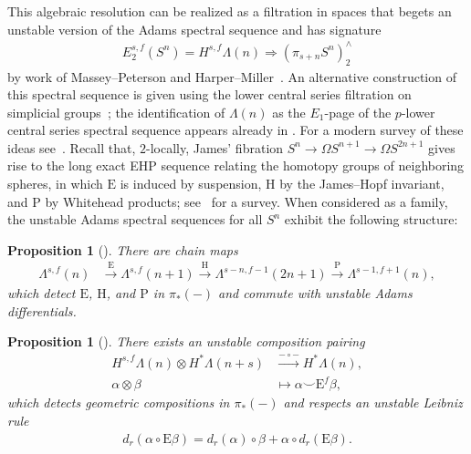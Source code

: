 \documentclass[dvipsnames,table]{amsart}
\newtheorem{proposition}[theorem]{Proposition}
\theoremstyle{definition}
\theoremstyle{remark}
\numberwithin{equation}{section}
\begin{document}
This algebraic resolution can be realized as a filtration in spaces that begets an unstable version of the Adams spectral sequence and has signature
\begin{align*}
  E_{2}^{s, f}(S^n) = H^{s, f}\Lambda(n) \Rightarrow (\pi_{s + n} S^n)^{\wedge}_{2}
\end{align*}
by work of Massey--Peterson and Harper--Miller~\cite{Massey_Peterson_1967, Harper_Miller_1989}.
An alternative construction of this spectral sequence is given using the lower central series filtration on simplicial groups~\cite{Bousfield_Curtis_1970, Curtis_1971, Liebowitz_1972}; the identification of $\Lambda(n)$ as the $E_1$-page of the $p$-lower central series spectral sequence appears already in \cite[Section~5.4]{Bousfield_Curtis_Kan_Quillen_Rector_Schlesinger_1966}. For a modern survey of these ideas see~\cite{Behrens_Malin_2024}. Recall that, $2$-locally, James' fibration $S^n \to \Omega S^{n+1} \to \Omega S^{2n+1}$ gives rise to the long exact EHP sequence relating the homotopy groups of neighboring spheres, in which $\mathrm{E}$ is induced by suspension, $\mathrm{H}$ by the James--Hopf invariant, and $\mathrm{P}$ by Whitehead products; see~\cite{Mahowald_Thompson_1995} for a survey. When considered as a family, the unstable Adams spectral sequences for all $S^n$ exhibit the following structure:

\begin{proposition}[\cite{Pavutnitskiy_Wu_2019, Singer_1975, Curtis_1971}] There are chain maps
\label{prop:ehp}
\begin{align*}
  \Lambda^{s, f}(n) &\stackrel{\mathrm{E}}{\longrightarrow} \Lambda^{s, f}(n + 1)
\stackrel{\mathrm{H}}{\longrightarrow}
\Lambda^{s - n, f - 1}(2n + 1)
\stackrel{\mathrm{P}}{\longrightarrow}
\Lambda^{s - 1, f + 1}(n),
\end{align*}
which detect $\mathrm{E}$, $\mathrm{H}$, and $\mathrm{P}$ in $\pi_\ast(-)$ and commute with unstable Adams differentials.
\end{proposition}

\begin{proposition}[\cite{Bousfield_Kan_1973a, Bousfield_Kan_1973b, Ivanov_Mikhailov_Wu_2018}]
\label{prop:leibniz}
There exists an unstable composition pairing
\begin{align*}
  H^{s, f}\Lambda(n) \otimes H^\ast \Lambda(n + s) &\xrightarrow{-\circ -} H^\ast \Lambda(n),\\
\alpha \otimes \beta &\longmapsto \alpha \smallsmile \mathrm{E}^{f}\beta,
\end{align*}
which detects geometric compositions in $\pi_\ast(-)$ and respects an unstable Leibniz rule
\begin{align*}
    d_r(\alpha \circ \mathrm{E} \beta) = d_r(\alpha) \circ \beta + \alpha \circ d_r(\mathrm{E} \beta).
\end{align*}
\end{proposition}
\end{document}
